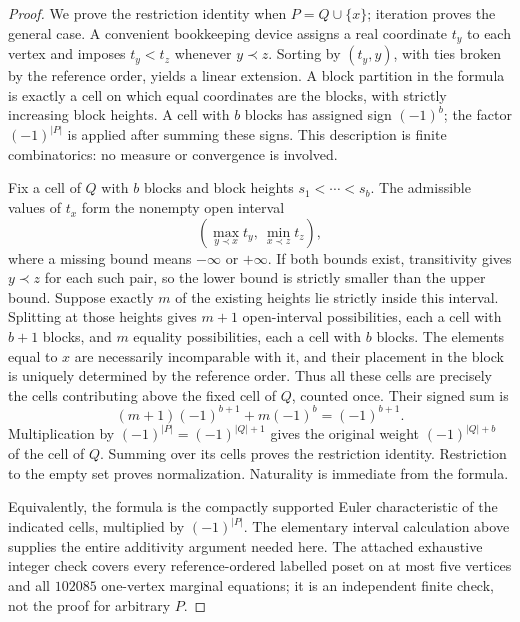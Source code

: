 \begin{proof}
We prove the restriction identity when $P=Q\cup\{x\}$; iteration
proves the general case. A convenient bookkeeping device assigns a
real coordinate $t_y$ to each vertex and imposes
$t_y<t_z$ whenever $y\prec z$. Sorting by $(t_y,y)$, with ties
broken by the reference order, yields a linear extension. A block
partition in the formula is exactly a cell on which equal
coordinates are the blocks, with strictly increasing block heights.
A cell with $b$ blocks has assigned sign $(-1)^b$; the factor
$(-1)^{|P|}$ is applied after summing these signs. This description
is finite combinatorics: no measure or convergence is involved.

Fix a cell of $Q$ with $b$ blocks and block heights
$s_1<\cdots<s_b$. The admissible values of $t_x$ form the nonempty
open interval
\[
 \left(\max_{y\prec x}t_y,\ \min_{x\prec z}t_z\right),
\]
where a missing bound means $-\infty$ or $+\infty$. If both bounds
exist, transitivity gives $y\prec z$ for each such pair, so the
lower bound is strictly smaller than the upper bound. Suppose
exactly $m$ of the existing heights lie strictly inside this
interval. Splitting at those heights gives $m+1$ open-interval
possibilities, each a cell with $b+1$ blocks, and $m$ equality
possibilities, each a cell with $b$ blocks. The elements equal to
$x$ are necessarily incomparable with it, and their placement in
the block is uniquely determined by the reference order. Thus all
these cells are precisely the cells contributing above the fixed
cell of $Q$, counted once. Their signed sum is
\[
 (m+1)(-1)^{b+1}+m(-1)^b=(-1)^{b+1}.
\]
Multiplication by $(-1)^{|P|}=(-1)^{|Q|+1}$ gives the original
weight $(-1)^{|Q|+b}$ of the cell of $Q$. Summing over its cells
proves the restriction identity. Restriction to the empty set
proves normalization. Naturality is immediate from the formula.

Equivalently, the formula is the compactly supported Euler
characteristic of the indicated cells, multiplied by $(-1)^{|P|}$.
The elementary interval calculation above supplies the entire
additivity argument needed here. The attached exhaustive integer
check covers every reference-ordered labelled poset on at most
five vertices and all $102085$ one-vertex marginal equations;
it is an independent finite check, not the proof for arbitrary $P$.
\end{proof}

